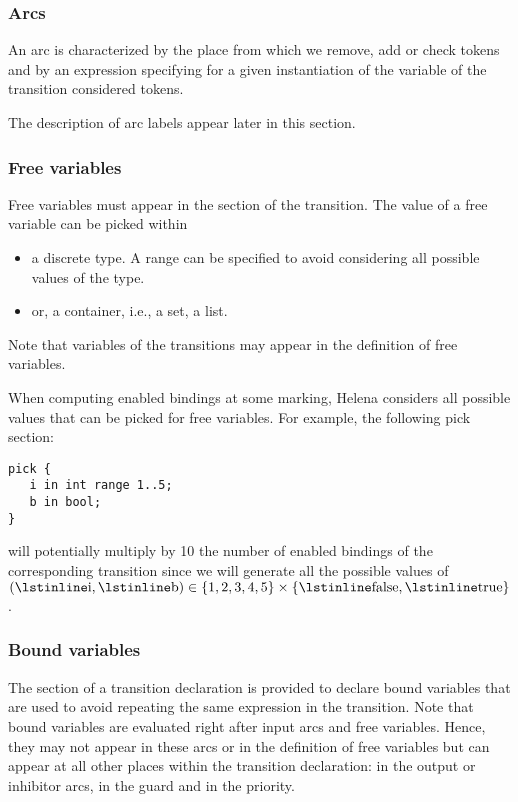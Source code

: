 \transitiondef


\subsubsection{Arcs}
An arc is characterized by the place from which we remove, add or
check tokens and by an expression specifying for a given instantiation
of the variable of the transition considered tokens.

The description of arc labels appear later in this section.\\

\arcdef


\subsubsection{Free variables}
Free variables must appear in the  section of the
transition.  The value of a free variable can be picked within
\begin{itemize}
\item a discrete type.  A range can be specified to avoid considering
  all possible values of the type.
\item or, a container, i.e., a set, a list.
\end{itemize}
Note that variables of the transitions may appear in the definition of
free variables.

When computing enabled bindings at some marking, Helena considers all
possible values that can be picked for free variables.  For example,
the following pick section:
\begin{lstlisting}
pick {
   i in int range 1..5;
   b in bool;
}
\end{lstlisting}
will potentially multiply by 10 the number of enabled bindings of the
corresponding transition since we will generate all the possible
values of $(\text{\LS{i}},\text{\LS{b}}) \in
\{ 1, 2, 3, 4, 5 \} \times \{ \text{\LS{false}}, \text{\LS{true}} \}$.\\

\freevariablesdef


\subsubsection{Bound variables}
The  section of a transition declaration is provided to
declare bound variables that are used to avoid repeating the same
expression in the transition.  Note that bound variables are evaluated
right after input arcs and free variables.  Hence, they may not appear
in these arcs or in the definition of free variables but can appear at
all other places within the transition declaration: in the output or
inhibitor arcs, in the guard and in the priority.

